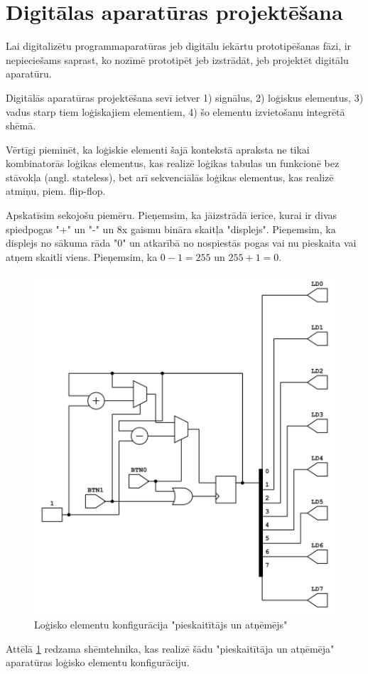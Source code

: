 \section{Digitālas aparatūras projektēšana}

Lai digitalizētu programmaparatūras jeb digitālu iekārtu prototipēšanas fāzi, ir
nepieciešams saprast, ko nozīmē prototipēt jeb izstrādāt, jeb projektēt digitālu
aparatūru.  
  
Digitālās aparatūras projektēšana sevī ietver 1) signālus, 2) loģiskus
elementus, 3) vadus starp tiem loģiskajiem elementiem, 4) šo elementu
izvietošanu integrētā shēmā. 
  
Vērtīgi pieminēt, ka loģiskie elementi šajā kontekstā apraksta ne tikai
kombinatorās loģikas elementus, kas realizē loģikas tabulas un funkcionē bez
stāvokļa (angl. stateless), bet arī sekvenciālās loģikas elementus, kas realizē
atmiņu, piem. flip-flop. \cite[para 1.1]{LarryMassengale2018} 

Apskatīsim sekojošu piemēru. Pieņemsim, ka jāizstrādā ierīce, kurai ir divas
spiedpogas "+" un "-" un 8x gaismu bināra skaitļa "displejs". Pieņemsim, ka
displejs no sākuma rāda "0" un atkarībā no nospiestās pogas vai nu pieskaita vai
atņem skaitli viens. Pieņemsim, ka \(0-1=255\) un \(255+1=0\).

\begin{figure}[H]
    \includegraphics[width=0.5\linewidth]{assets/counter.png}
    \centering
    \caption{Loģisko elementu konfigurācija "pieskaitītājs un atņēmējs"}
    \label{fig:counter}
\end{figure}

Attēlā \ref{fig:counter} redzama shēmtehnika, kas realizē šādu "pieskaitītāja un
atņēmēja" aparatūras loģisko elementu konfigurāciju.

